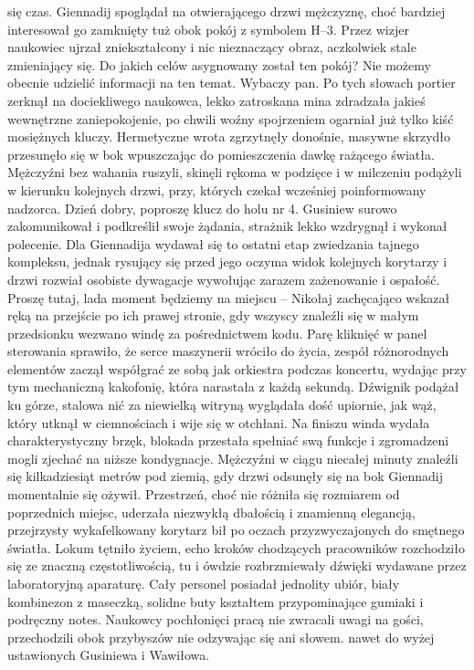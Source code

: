 \documentclass[../MAIN.tex]{subfiles}
\begin{document}
się czas. Giennadij spoglądał na otwierającego drzwi mężczyznę, choć bardziej interesował go zamknięty tuż obok pokój z symbolem H--3. Przez wizjer naukowiec ujrzał zniekształcony i nic nieznaczący obraz, aczkolwiek stale zmieniający się. 
% 
\sx Do jakich celów asygnowany został ten pokój? 
\xx Nie możemy obecnie udzielić informacji na ten temat. Wybaczy pan.
\qd
Po tych słowach portier zerknął na dociekliwego naukowca, lekko zatroskana mina zdradzała jakieś wewnętrzne zaniepokojenie, po chwili woźny spojrzeniem ogarniał już tylko kiść mosiężnych kluczy. Hermetyczne wrota zgrzytnęły donośnie, masywne skrzydło przesunęło się w bok wpuszczając do pomieszczenia dawkę rażącego światła. Mężczyźni bez wahania ruszyli, skinęli rękoma w podzięce i w milczeniu podążyli w kierunku kolejnych drzwi, przy, których czekał wcześniej poinformowany nadzorca. 
% 
\sx Dzień dobry, poproszę klucz do holu nr 4.
\qd
Gusiniew surowo zakomunikował i podkreślił swoje żądania, strażnik lekko wzdrygnął i wykonał polecenie. Dla Giennadija wydawał się to ostatni etap zwiedzania tajnego kompleksu, jednak rysujący się przed jego oczyma widok kolejnych korytarzy i drzwi rozwiał osobiste dywagacje wywołując zarazem zażenowanie i ospałość. 
% 
\sx Proszę tutaj, lada moment będziemy na miejscu -- Nikołaj zachęcająco wskazał ręką na przejście po ich prawej stronie, gdy wszyscy znaleźli się w małym przedsionku wezwano windę za pośrednictwem kodu. 
\qd
Parę kliknięć w panel sterowania sprawiło, że serce maszynerii wróciło do życia, zespół różnorodnych elementów zaczął współgrać ze sobą jak orkiestra podczas koncertu, wydając przy tym mechaniczną kakofonię, która narastała z każdą sekundą. Dźwignik podążał ku górze, stalowa nić za niewielką witryną wyglądała dość upiornie, jak wąż, który utknął w ciemnościach i wije się w otchłani. Na finiszu winda wydała charakterystyczny brzęk, blokada przestała spełniać swą funkcje i zgromadzeni mogli zjechać na niższe kondygnacje. Mężczyźni w ciągu niecałej minuty znaleźli się kilkadziesiąt metrów pod ziemią, gdy drzwi odsunęły się na bok Giennadij momentalnie się ożywił. Przestrzeń, choć nie różniła się rozmiarem od poprzednich miejsc, uderzała niezwykłą dbałością i znamienną elegancją, przejrzysty wykafelkowany 
korytarz bił po oczach przyzwyczajonych do smętnego światła. Lokum tętniło życiem, echo kroków chodzących pracowników rozchodziło się ze znaczną częstotliwością, tu i ówdzie rozbrzmiewały dźwięki wydawane przez laboratoryjną aparaturę. Cały personel posiadał jednolity ubiór, biały kombinezon z maseczką, solidne buty kształtem przypominające gumiaki i podręczny notes. Naukowcy pochłonięci pracą nie zwracali uwagi na gości, przechodzili obok przybyszów nie odzywając się ani słowem. nawet do wyżej ustawionych Gusiniewa i Wawiłowa. 
\end{document}
